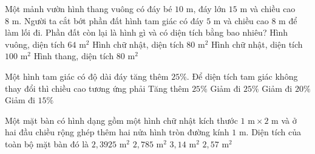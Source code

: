 \begin{ex} %
Một mảnh vườn hình thang vuông có đáy bé $10\text{ m}$, đáy lớn $15\text{ m}$ và chiều cao $8\text{ m}$. Người ta cắt bớt phần đất hình tam giác có đáy $5\text{ m}$ và chiều cao $8\text{ m}$ để làm lối đi. Phần đất còn lại là hình gì và có diện tích bằng bao nhiêu?
\choice
{Hình vuông, diện tích $64\text{ m}^2$}
{\True Hình chữ nhật, diện tích $80\text{ m}^2$}
{Hình chữ nhật, diện tích $100\text{ m}^2$}
{Hình thang, diện tích $80\text{ m}^2$}
\end{ex}

\begin{ex} %
Một hình tam giác có độ dài đáy tăng thêm $25\%$. Để diện tích tam giác không thay đổi thì chiều cao tương ứng phải
\choice
{Tăng thêm $25\%$}
{Giảm đi $25\%$}
{\True Giảm đi $20\%$}
{Giảm đi $15\%$}
\end{ex}

\begin{ex} %
Một mặt bàn có hình dạng gồm một hình chữ nhật kích thước $1\text{ m} \times 2\text{ m}$ và ở hai đầu chiều rộng ghép thêm hai nửa hình tròn đường kính $1\text{ m}$. Diện tích của toàn bộ mặt bàn đó là
\choice
{$2{,}3925\text{ m}^2$}
{\True $2{,}785\text{ m}^2$}
{$3{,}14\text{ m}^2$}
{$2{,}57\text{ m}^2$}
\end{ex}

